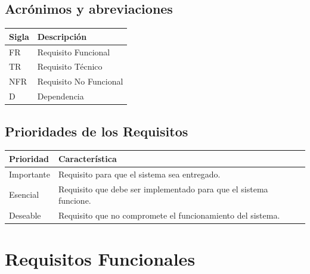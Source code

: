 \documentclass[a4paper]{article}
\begin{document}
  \subsection{Acrónimos y abreviaciones}
    \FloatBarrier
    \begin{table}[H]
      \begin{center}
        \begin{tabular}[pos]{|m{2cm} | m{12cm}|} 
          \hline
          \cellcolor[gray]{0.9}\textbf{Sigla} & \cellcolor[gray]{0.9}\textbf{Descripción} \\ \hline
          FR      & Requisito Funcional  \\ \hline
                    TR      & Requisito Técnico  \\ \hline
          NFR     & Requisito No Funcional  \\ \hline
          D       & Dependencia  \\ \hline
        \end{tabular}
      \end{center}
    \end{table}  

  \subsection{Prioridades de los Requisitos}
    \FloatBarrier
    \begin{table}[H]
      \begin{center}
        \begin{tabular}[pos]{|m{2cm} | m{12cm}|} 
          \hline
          \cellcolor[gray]{0.9}\textbf{Prioridad} & \cellcolor[gray]{0.9}\textbf{Característica} \\ \hline
          Importante     & Requisito para que el sistema sea entregado.  \\ \hline
          Esencial       & Requisito que debe ser implementado para que el sistema funcione.  \\ \hline
          Deseable       & Requisito que no compromete el funcionamiento del sistema.  \\ \hline
        \end{tabular}
      \end{center}
    \end{table}  

  \section{Requisitos Funcionales}
    
\end{document}
